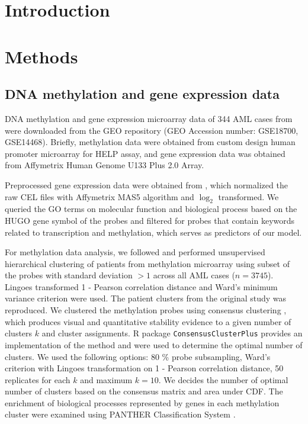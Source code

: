\documentclass{article}
\begin{document}
\section{Introduction}



\section{Methods}


\subsection{\citet{figueroa2010dna} DNA methylation and gene expression data}

DNA methylation and gene expression microarray data of 344 AML cases from \citet{figueroa2010dna} were downloaded from the GEO repository (GEO Accession number: GSE18700, GSE14468). Briefly, methylation data were obtained from custom design human promoter microarray for HELP assay, and gene expression data was obtained from Affymetrix Human Genome U133 Plus 2.0 Array. 

Preprocessed gene expression data were obtained from \citet{gentles2015prognostic}, which normalized the raw CEL files with Affymetrix MAS5 algorithm and $\log_2$ transformed. We queried the GO terms on molecular function and biological process based on the HUGO gene symbol of the probes and filtered for probes that contain keywords related to transcription and methylation, which serves as predictors of our model.

For methylation data analysis, we followed \citet{figueroa2010dna} and performed unsupervised hierarchical clustering of patients from methylation microarray using subset of the probes with standard deviation $> 1$ across all AML cases ($n = 3745$). Lingoes transformed 1 - Pearson correlation distance and Ward's minimum variance criterion were used. The patient clusters from the original study was reproduced. We clustered the methylation probes using consensus clustering \citep{monti2003consensus}, which produces visual and quantitative stability evidence to a given number of clusters $k$ and cluster assignments. R package \texttt{ConsensusClusterPlus} \citep{wilkerson2010consensusclusterplus} provides an implementation of the method and were used to determine the optimal number of clusters. We used the following options: 80 \% probe subsampling, Ward's criterion with Lingoes transformation on 1 - Pearson correlation distance, 50 replicates for each $k$  and maximum $k = 10$.  We decides the number of optimal number of clusters based on the consensus matrix and area under CDF. The enrichment of biological processes represented by genes in each methylation cluster were examined using PANTHER Classification System \citep{mi2013large}.
\end{document}
